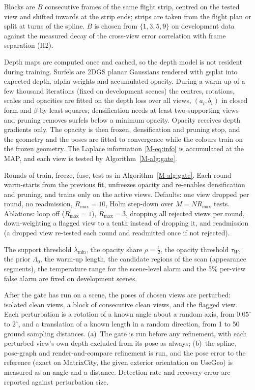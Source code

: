  Blocks are $B$ consecutive frames of the same flight strip, centred on the tested view and
shifted inwards at the strip ends; strips are taken from the flight plan or split at turns of the spline.
$B$ is chosen from $\{1,3,5,9\}$ on development data against the measured decay of the cross-view error
correlation with frame separation (H2).

 Depth maps are computed once and cached, so the depth model is not
resident during training. Surfels are 2DGS planar Gaussians rendered with gsplat into expected depth,
alpha weights and accumulated opacity. During a warm-up of a few thousand iterations (fixed on
development scenes) the centres, rotations, scales and opacities are fitted on the depth loss over all
views, $(a_i,b_i)$ in closed form and $\beta$ by least squares; densification needs at least two
supporting views and pruning removes surfels below a minimum opacity. Opacity receives depth gradients
only. The opacity is then frozen, densification and pruning stop, and the geometry and the poses are fitted
to convergence while the colours train on the frozen geometry. The Laplace information \eqref{M-eq:info}
is accumulated at the MAP, and each view is tested by Algorithm~\ref{M-alg:gate}.

 Rounds of train, freeze, fuse, test as in Algorithm~\ref{M-alg:gate}. Each round warm-starts
from the previous fit, unfreezes opacity and re-enables densification and pruning, and trains only on
the active views. Defaults: one view dropped per round, no readmission, $R_{\max}=10$, Holm step-down over
$M=NR_{\max}$ tests. Ablations: loop off ($R_{\max}=1$), $R_{\max}=3$, dropping all rejected views per
round, down-weighting a flagged view to a tenth instead of dropping it, and readmission (a dropped view
re-tested each round and readmitted once if not rejected).

 The support threshold $\lambda_{\min}$, the opacity share $\rho=\tfrac12$, the
opacity threshold $\tau_W$, the prior $\Lambda_0$, the warm-up length, the candidate regions of the scan
(appearance segments), the temperature range for the scene-level alarm and the 5\% per-view false alarm
are fixed on development scenes. 

 After the gate has run on a scene, the poses of chosen views are
perturbed: isolated clean views, a block of consecutive clean views, and the flagged view. Each
perturbation is a rotation of a known angle about a random axis, from $0.05^{\circ}$ to $2^{\circ}$, and a
translation of a known length in a random direction, from 1 to 50 ground sampling distances. (a)~The
gate is run before any refinement, with each perturbed view's own depth excluded from its pose as
always; (b)~the spline, pose-graph and render-and-compare refinement is run, and the pose error to the
reference (exact on MatrixCity, the given exterior orientation on UseGeo) is measured as an angle and a
distance. Detection rate and recovery error are reported against perturbation size.


